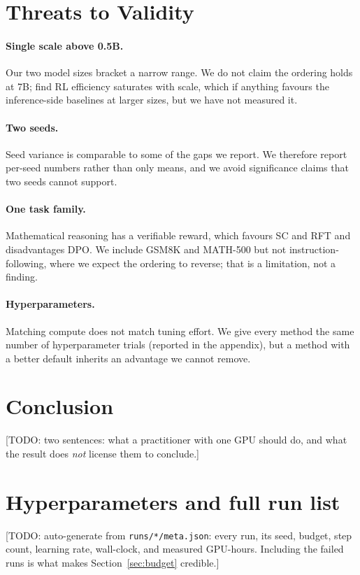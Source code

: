 \documentclass[11pt]{article}
\newif\ifacltemplate
\providecommand{\textcolor}[1]{}
\providecommand{\citet}[1]{\cite{#1}}
\newcommand{\TODO}[1]{\textcolor{red}{[TODO: #1]}}
\begin{document}
\section{Threats to Validity}
\paragraph{Single scale above 0.5B.} Our two model sizes bracket a narrow range.
We do not claim the ordering holds at 7B; \citet{tan2026scaling} find RL
efficiency saturates with scale, which if anything favours the inference-side
baselines at larger sizes, but we have not measured it.

\paragraph{Two seeds.} Seed variance is comparable to some of the gaps we
report. We therefore report per-seed numbers rather than only means, and we
avoid significance claims that two seeds cannot support.

\paragraph{One task family.} Mathematical reasoning has a verifiable reward,
which favours SC and RFT and disadvantages DPO. We include GSM8K and MATH-500
but not instruction-following, where we expect the ordering to reverse; that
is a limitation, not a finding.

\paragraph{Hyperparameters.} Matching compute does not match tuning effort. We
give every method the same number of hyperparameter trials (reported in the
appendix), but a method with a better default inherits an advantage we cannot
remove.

\section{Conclusion}
\TODO{two sentences: what a practitioner with one GPU should do, and what the
result does \emph{not} license them to conclude.}

\ifacltemplate\else\fi


\appendix
\section{Hyperparameters and full run list}
\TODO{auto-generate from \texttt{runs/*/meta.json}: every run, its seed,
budget, step count, learning rate, wall-clock, and measured GPU-hours. Including
the failed runs is what makes Section~\ref{sec:budget} credible.}
\end{document}
